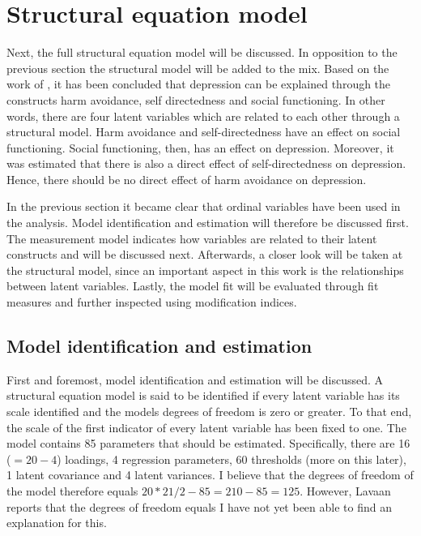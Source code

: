 \documentclass[11pt]{article}
\begin{document}
\FloatBarrier\pagebreak\section{Structural equation model}

Next, the full structural equation model will be discussed. In opposition to the
previous section the structural model will be added to the mix. Based on the
work of \textcite{tse2011}, it has been concluded that depression can be
explained through the constructs harm avoidance, self directedness and social
functioning. In other words, there are four latent variables which are related
to each other through a structural model. Harm avoidance and self-directedness
have an effect on social functioning. Social functioning, then, has an effect on
depression. Moreover, it was estimated that there is also a direct effect of
self-directedness on depression. Hence, there should be no direct effect of harm
avoidance on depression.

In the previous section it became clear that ordinal variables have been used in
the analysis. Model identification and estimation will therefore be discussed
first. The measurement model indicates how variables are related to their latent
constructs and will be discussed next. Afterwards, a closer look will be taken
at the structural model, since an important aspect in this work is the
relationships between latent variables. Lastly, the model fit will be evaluated
through fit measures and further inspected using modification indices.

\subsection{Model identification and estimation}

First and foremost, model identification and estimation will be discussed.
A structural equation model is said to be identified if every latent variable
has its scale identified and the models degrees of freedom is zero or greater.
To that end, the scale of the first indicator of every latent variable has been
fixed to one. The model contains 85 parameters that should be estimated.
Specifically, there are 16 ($=20 - 4$) loadings, 4 regression parameters, 60
thresholds (more on this later), 1 latent covariance and 4 latent variances.
I believe that the degrees of freedom of the model therefore equals $20*21/2 - 85
= 210 - 85 = 125$. However, Lavaan reports that the degrees of freedom equals
I have not yet been able to find an explanation for this.
\end{document}
